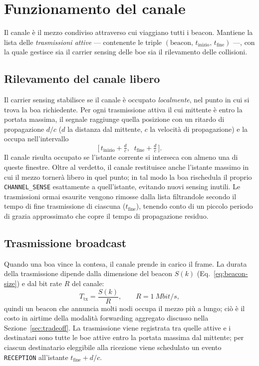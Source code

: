 \section{Funzionamento del canale}
\label{sec:channel}
Il canale \`e il mezzo condiviso attraverso cui viaggiano tutti i beacon. Mantiene la
lista delle \emph{trasmissioni attive} --- contenente le triple $(\text{beacon},\, t_{\text{inizio}},\,
t_{\text{fine}})$ ---, con la quale gestisce sia il carrier sensing delle boe sia il rilevamento delle collisioni.

\subsection{Rilevamento del canale libero}
\label{sec:carrier-sense}
Il carrier sensing stabilisce se il canale \`e occupato \emph{localmente}, nel
punto in cui si trova la boa richiedente. Per ogni trasmissione attiva il cui mittente \`e entro la portata massima, il segnale
raggiunge quella posizione con un ritardo di propagazione $d/c$ ($d$ la
distanza dal mittente, $c$ la velocit\`a di propagazione) e la occupa nell'intervallo
\begin{equation}
  \Big[\, t_{\text{inizio}} + \tfrac{d}{c},\;\; t_{\text{fine}} + \tfrac{d}{c} \,\Big].
  \label{eq:busy-window}
\end{equation}
Il canale risulta occupato se l'istante corrente si interseca con almeno una di queste finestre. 
Oltre al verdetto, il canale restituisce anche l'istante massimo in cui il mezzo torner\`a
libero in quel punto; in tal modo la boa rischedula il proprio \texttt{CHANNEL\_SENSE} esattamente a
quell'istante, evitando nuovi sensing inutili. Le trasmissioni ormai esaurite vengono
rimosse dalla lista
filtrandole secondo il tempo di fine trasmissione di ciascuna ($t_{\text{fine}}$),
tenendo conto di un piccolo periodo di grazia approssimato che copre il tempo di propagazione residuo.


\subsection{Trasmissione broadcast}
\label{sec:broadcast-impl}
Quando una boa vince la contesa, il canale prende in carico il frame.
La durata della trasmissione dipende dalla dimensione del beacon $S(k)$
(Eq.~\ref{eq:beacon-size}) e dal bit rate $R$ del canale:
\begin{equation}
  T_{\text{tx}} = \frac{S(k)}{R},
  \qquad R = \SI{1}{Mbit/s},
  \label{eq:txtime}
\end{equation}
quindi un beacon che annuncia molti nodi occupa il mezzo pi\`u a lungo; ci\`o \`e il costo
in airtime della modalit\`a forwarding aggregato discusso nella Sezione~\ref{sec:tradeoff}. La
trasmissione viene registrata tra quelle attive e i destinatari sono tutte le boe attive
entro la portata massima dal mittente; per ciascun destinatario eleggibile alla ricezione viene schedulato
un evento \texttt{RECEPTION} all'istante $t_{\text{fine}} + d/c$.

